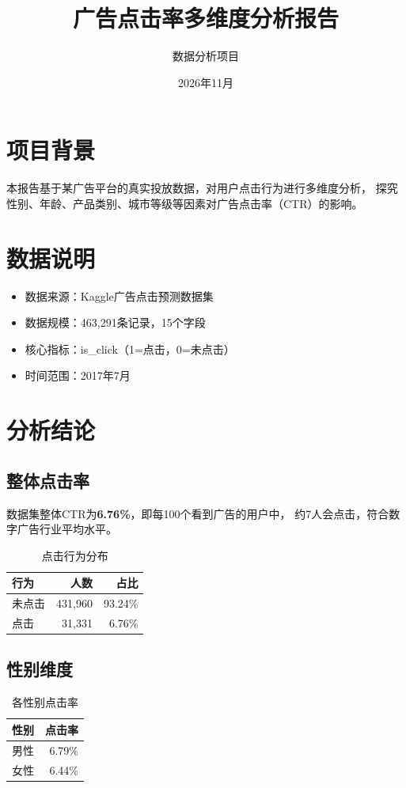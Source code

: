 \documentclass[12pt, a4paper]{article}
\title{\textbf{广告点击率多维度分析报告}}
\author{数据分析项目}
\date{2026年11月}
\begin{document}
\maketitle

\section{项目背景}
本报告基于某广告平台的真实投放数据，对用户点击行为进行多维度分析，
探究性别、年龄、产品类别、城市等级等因素对广告点击率（CTR）的影响。

\section{数据说明}
\begin{itemize}
    \item 数据来源：Kaggle广告点击预测数据集
    \item 数据规模：463,291条记录，15个字段
    \item 核心指标：is\_click（1=点击，0=未点击）
    \item 时间范围：2017年7月
\end{itemize}

\section{分析结论}

\subsection{整体点击率}
数据集整体CTR为\textbf{6.76\%}，即每100个看到广告的用户中，
约7人会点击，符合数字广告行业平均水平。

\begin{table}[h]
\centering
\caption{点击行为分布}
\begin{tabular}{lrr}
\toprule
行为 & 人数 & 占比 \\
\midrule
未点击 & 431,960 & 93.24\% \\
点击 & 31,331 & 6.76\% \\
\bottomrule
\end{tabular}
\end{table}

\subsection{性别维度}
\begin{table}[h]
\centering
\caption{各性别点击率}
\begin{tabular}{lr}
\toprule
性别 & 点击率 \\
\midrule
男性 & 6.79\% \\
女性 & 6.44\% \\
\bottomrule
\end{tabular}
\end{table}
\end{document}
